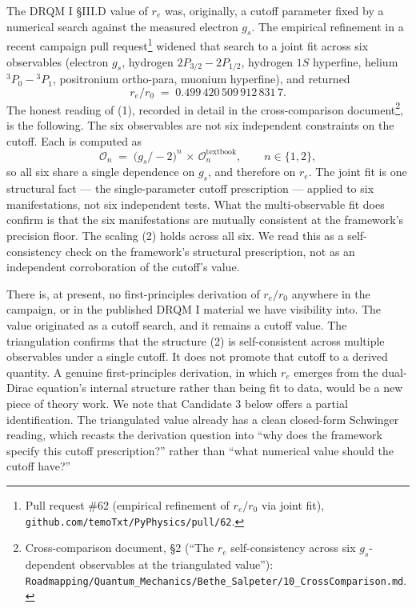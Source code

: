 \documentclass[
  11pt,
]{article}
\begin{document}
The DRQM I §III.D value of \(r_e\) was, originally, a cutoff parameter
fixed by a numerical search against the measured electron \(g_s\). The
empirical refinement in a recent campaign pull request\footnote{Pull
  request \#62 (empirical refinement of \(r_e/r_0\) via joint fit),
  \texttt{github.com/temoTxt/PyPhysics/pull/62}.} widened that search to
a joint fit across six observables (electron \(g_s\), hydrogen
\(2P_{3/2}-2P_{1/2}\), hydrogen \(1S\) hyperfine, helium
\({}^3P_0 - {}^3P_1\), positronium ortho-para, muonium hyperfine), and
returned \[
r_e/r_0 \;=\; 0.499\,420\,509\,912\,831\,7. \tag{1}
\] The honest reading of (1), recorded in detail in the cross-comparison
document\footnote{Cross-comparison document, §2 (``The \(r_e\)
  self-consistency across six \(g_s\)-dependent observables at the
  triangulated value''):
  \texttt{Roadmapping/Quantum\_Mechanics/Bethe\_Salpeter/10\_CrossComparison.md}.},
is the following. The six observables are not six independent
constraints on the cutoff. Each is computed as \[
\mathcal{O}_n \;=\; \bigl( g_s/-2 \bigr)^n \,\times\, \mathcal{O}_n^{\text{textbook}}, \qquad n \in \{1,2\}, \tag{2}
\] so all six share a single dependence on \(g_s\), and therefore on
\(r_e\). The joint fit is one structural fact --- the single-parameter
cutoff prescription --- applied to six manifestations, not six
independent tests. What the multi-observable fit does confirm is that
the six manifestations are mutually consistent at the framework's
precision floor. The scaling (2) holds across all six. We read this as a
self-consistency check on the framework's structural prescription, not
as an independent corroboration of the cutoff's value.

There is, at present, no first-principles derivation of \(r_e/r_0\)
anywhere in the campaign, or in the published DRQM I material we have
visibility into. The value originated as a cutoff search, and it remains
a cutoff value. The triangulation confirms that the structure (2) is
self-consistent across multiple observables under a single cutoff. It
does not promote that cutoff to a derived quantity. A genuine
first-principles derivation, in which \(r_e\) emerges from the
dual-Dirac equation's internal structure rather than being fit to data,
would be a new piece of theory work. We note that Candidate 3 below
offers a partial identification. The triangulated value already has a
clean closed-form Schwinger reading, which recasts the derivation
question into ``why does the framework specify this cutoff
prescription?'' rather than ``what numerical value should the cutoff
have?''
\end{document}
